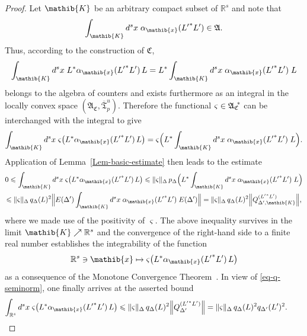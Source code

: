 \documentclass[11pt,twoside,openright]{report}
\theoremstyle{definition}
\theoremstyle{plain}
\theoremstyle{remark}
\theoremstyle{assumption}
\newcommand{\norm}[1]{\lVert #1 \rVert}
\newcommand{\Bnorm}[1]{\Bigl\lVert #1 \Bigr\rVert}
\newcommand{\BpDx}[1]{p_\Delta \Bigl( #1 \Bigr)}
\newcommand{\qDx}[1]{q_\Delta ( #1 )}
\newcommand{\qDprimex}[1]{q_{\Delta'} ( #1 )}
\newcommand{\Afrak}{\mathfrak{A}}
\newcommand{\Cfrak}{\mathfrak{C}}
\newcommand{\Kib}{\mathib{K}}
\newcommand{\xib}{\mathib{x}}
\newcommand{\Rs}{\mathbb{R}^s}
\newcommand{\Tfrakbar}{\overline{\mathfrak{T}}}
\newcommand{\AC}{\mathfrak{A}_\mathfrak{C}}
\newcommand{\EDprime}{E ( \Delta' )}
\newcommand{\ACstar}{{\mathfrak{A}_\mathfrak{C}}^{\negthickspace *}}
\newcommand{\aibx}{\alpha_\mathib{x}}
\begin{document}
\begin{proof}
  Let $\Kib$ be an arbitrary compact subset of $\Rs$ and note that
  \begin{equation*}
    \int_\Kib d^s x \; \aibx ( {L'}^* L' ) \in \Afrak \text{.}
  \end{equation*}
  Thus, according to the construction of $\Cfrak$,
  \begin{equation*}
    \int_\Kib d^s x \; L^* \aibx ( {L'}^* L' ) \, L = L^* \int_\Kib
    d^s x \; \aibx ( {L'}^* L' ) \; L
  \end{equation*}
  belongs to the algebra of counters and exists furthermore as an
  integral in the locally convex space $( \AC , \Tfrakbar^u_p
  )$. Therefore the functional $\varsigma \in \ACstar$ can be
  interchanged with the integral
  \cite[Proposition~II.5.7]{fell/doran:1988a} to give
  \begin{equation*}
    \int_\Kib d^s x \; \varsigma \bigl( L^* \aibx ( {L'}^* L' ) \, L
    \bigr) = \varsigma \Bigl( L^* \int_\Kib d^s x \; \aibx ( {L'}^* L'
    ) \; L \Bigr) \text{.}
  \end{equation*}
  Application of Lemma~\ref{Lem-basic-estimate} then leads to the
  estimate
  \begin{multline*}
    0 \leqslant \int_\Kib d^s x \; \varsigma \bigl( L^* \aibx ( {L'}^*
    L' ) \, L \bigr) \leqslant \norm{\varsigma}_\Delta \, \BpDx{L^*
    \int_\Kib d^s x \; \aibx ( {L'}^* L' ) \; L} \\
    \leqslant \norm{\varsigma}_\Delta \, \qDx{L}^2 \Bnorm{\EDprime
    \int_\Kib d^s x \; \aibx ( {L'}^* L' ) \; \EDprime} =
    \norm{\varsigma}_\Delta \, \qDx{L}^2 \Bnorm{Q_{\Delta' , \Kib}^{(
    {L'}^* L' )}} \text{,}
  \end{multline*}
  where we made use of the positivity of $\varsigma$. The above
  inequality survives in the limit $\Kib \nearrow \Rs$ and the
  convergence of the right-hand side to a finite real number
  establishes the integrability of the function
  \begin{equation*}
    \Rs \ni \xib \mapsto \varsigma \bigl( L^* \aibx ( {L'}^* L' ) \, L
    \bigr)
  \end{equation*}
  as a consequence of the Monotone Convergence
  Theorem~\cite[II.2.7]{fell/doran:1988a}. In view of
  \eqref{eq-q-seminorm}, one finally arrives at the asserted bound
  \begin{equation*}
    \int_{\Rs} d^s x \; \varsigma \bigl( L^* \aibx ( {L'}^* L' ) \, L
    \bigr) \leqslant \norm{\varsigma}_\Delta \, \qDx{L}^2
    \Bnorm{Q_{\Delta'}^{( {L'}^* L' )}} = \norm{\varsigma}_\Delta \,
    \qDx{L}^2 \qDprimex{L'}^2 \text{.} \tag*{\qed}
  \end{equation*}
  \renewcommand{\qed}{}
\end{proof}
\end{document}
